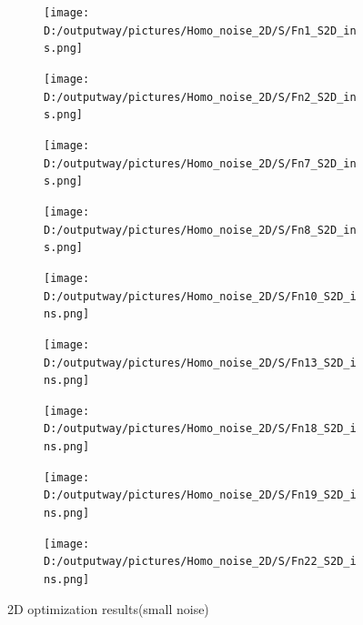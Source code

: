 \documentclass{article}
\begin{document}
\begin{figure}[H]
    \centering
    \begin{subfigure}[t]{.32\linewidth}
        \centering
        \texttt{[image: D:/outputway/pictures/Homo\_noise\_2D/S/Fn1\_S2D\_ins.png]}
    \end{subfigure}
    \begin{subfigure}[t]{.32\linewidth}
        \centering
        \texttt{[image: D:/outputway/pictures/Homo\_noise\_2D/S/Fn2\_S2D\_ins.png]}
    \end{subfigure}
    \begin{subfigure}[t]{.32\linewidth}
        \centering
        \texttt{[image: D:/outputway/pictures/Homo\_noise\_2D/S/Fn7\_S2D\_ins.png]}
    \end{subfigure}
    \begin{subfigure}[t]{.32\linewidth}
        \centering
        \texttt{[image: D:/outputway/pictures/Homo\_noise\_2D/S/Fn8\_S2D\_ins.png]}
    \end{subfigure}
    \begin{subfigure}[t]{.32\linewidth}
        \centering
        \texttt{[image: D:/outputway/pictures/Homo\_noise\_2D/S/Fn10\_S2D\_ins.png]}
    \end{subfigure}
    \begin{subfigure}[t]{.32\linewidth}
        \centering
        \texttt{[image: D:/outputway/pictures/Homo\_noise\_2D/S/Fn13\_S2D\_ins.png]}
    \end{subfigure}
    \begin{subfigure}[t]{.32\linewidth}
        \centering
        \texttt{[image: D:/outputway/pictures/Homo\_noise\_2D/S/Fn18\_S2D\_ins.png]}
    \end{subfigure}
    \begin{subfigure}[t]{.32\linewidth}
        \centering
        \texttt{[image: D:/outputway/pictures/Homo\_noise\_2D/S/Fn19\_S2D\_ins.png]}
    \end{subfigure}
    \begin{subfigure}[t]{.32\linewidth}
        \centering
        \texttt{[image: D:/outputway/pictures/Homo\_noise\_2D/S/Fn22\_S2D\_ins.png]}
    \end{subfigure}
    \caption{2D optimization results(small noise)}
    \label{Fig2}
\end{figure}
\end{document}
